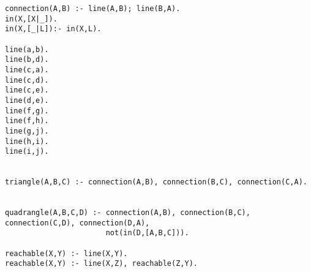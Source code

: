 \begin{verbatim}
connection(A,B) :- line(A,B); line(B,A).
in(X,[X|_]).
in(X,[_|L]):- in(X,L).

line(a,b).
line(b,d).
line(c,a).
line(c,d).
line(c,e).
line(d,e).
line(f,g).
line(f,h).
line(g,j).
line(h,i).
line(i,j).


triangle(A,B,C) :- connection(A,B), connection(B,C), connection(C,A).


quadrangle(A,B,C,D) :- connection(A,B), connection(B,C), connection(C,D), connection(D,A), 
                       not(in(D,[A,B,C])).

reachable(X,Y) :- line(X,Y).
reachable(X,Y) :- line(X,Z), reachable(Z,Y).
\end{verbatim}
